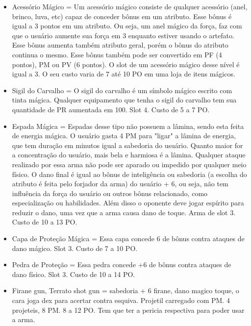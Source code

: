 \begin{itemize}	

\item Acessório Mágico = Um acessório mágico consiste de qualquer acessório (anel, brinco, luva, etc) capaz de conceder bônus em um atributo. Esse bônus é igual a 3 pontos em um atributo. Ou seja, um anel mágico da força, faz com que o usuário aumente sua força em 3 enquanto estiver usando o artefato. Esse bônus aumenta também atributo geral, porém o bônus do atributo continua o mesmo. Esse bônus também pode ser convertido em PF (4 pontos), PM ou PV (6 pontos). O slot de um acessório mágico desse nível é igual a 3. O seu custo varia de 7 até 10 PO em uma loja de itens mágicos.

\item Sigil do Carvalho = O sigil do carvalho é um símbolo mágico escrito com tinta mágica. Qualquer equipamento que tenha o sigil do carvalho tem sua quantidade de PR aumentada em 100. Slot 4. Custo de 5 a 7 PO.

\item Espada Mágica = Espadas desse tipo não possuem a lâmina, sendo esta feita de energia mágica. O usuário gasta 4 PM para "ligar" a lâmina de energia, que tem duração em minutos igual a sabedoria do usuário. Quanto maior for a concentração do usuário, mais bela e harmiosa é a lâmina. Qualquer ataque realizado por essa arma não pode ser aparado ou impedido por qualquer meio físico. O dano final é igual ao bônus de inteligência ou sabedoria (a escolha do atributo é feita pelo forjador da arma) do usuário + 6, ou seja,  não tem influência da força do usuário ou outros bônus relacionado, como especialização ou habilidades. Além disso o oponente deve jogar espírito para reduzir o dano, uma vez que a arma causa dano de toque. Arma de slot 3. Custo de 10 a 13 PO.

\item Capa de Proteção Mágica = Essa capa concede 6 de bônus contra ataques de dano mágico. Slot 3. Custo de 7 a 10 PO.

\item Pedra de Proteção = Essa pedra concede +6 de bônus contra ataques de dano físico. Slot 3. Custo de 10 a 14 PO.

\item Firane gun, Terrato shot gun = sabedoria + 6 firane, dano magico toque, o cara joga dex para acertar contra esquiva. Projetil carregado com PM. 4 projeteis, 8 PM. 8 a 12 PO. Tem que ter a pericia respectiva para poder usar a arma.


\end{itemize}
